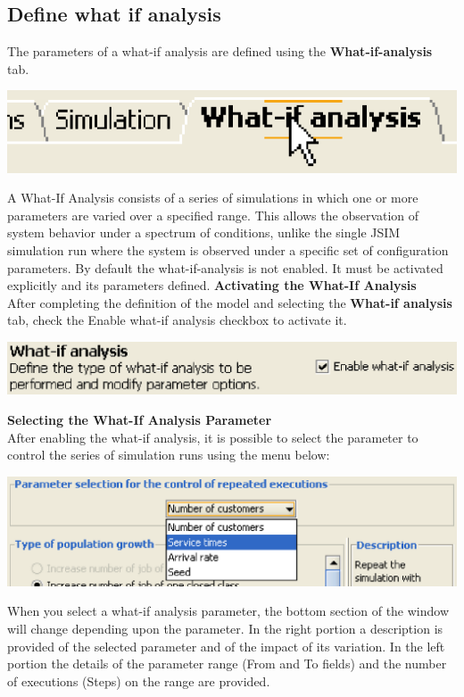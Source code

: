 \begin{description*}
\subsection{Define what if analysis}
\label{sec:DefineWhatIfAnalysis}
The parameters of a what-if analysis are defined using the \textbf{What-if-analysis} tab.
\begin{center}
\includegraphics[scale=.5]{img/jsim/whatif_tab.eps}
\end{center}
A What-If Analysis consists of a series of simulations in which one or more parameters are varied over a specified range. This allows the observation of system behavior under a spectrum of conditions, unlike the single JSIM simulation run where the system is observed under a specific set of configuration parameters.
By default the what-if-analysis is not enabled. It must be activated explicitly and its parameters defined.
\textbf{Activating the What-If Analysis }\\
After completing the definition of the model and selecting the \textbf{What-if analysis} tab, check the Enable what-if analysis checkbox to activate it.
\begin{center}
\includegraphics[scale=.5]{img/jsim/enable_box.eps}
\end{center}
\textbf{Selecting the What-If Analysis Parameter}\\
After enabling the what-if analysis, it is possible to select the parameter to control the series of simulation runs using the menu below:
\begin{center}
\includegraphics[scale=.5]{img/jsim/type_selection.eps}
\end{center}
When you select a what-if analysis parameter, the bottom section of the window will change depending upon the parameter. In the right portion a description is provided of the selected parameter and of the impact of its variation. In the left portion the details of the parameter range (From and To fields) and the number of executions (Steps) on the range are provided.

\end{description*}
